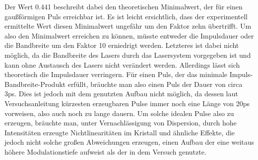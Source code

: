 Der Wert 0.441 beschreibt dabei den theoretischen Minimalwert, der für einen gaußförmigen Puls erreichbar ist. Es ist leicht ersichtlich, dass der experimentell ermittelte Wert diesen Minimalwert ungefähr um den Faktor zehn übertrifft. Um also den Minimalwert erreichen zu können, müsste entweder die Impulsdauer oder die Bandbreite um den Faktor 10 erniedrigt werden. Letzteres ist dabei nicht möglich, da die Bandbreite des Lasers durch das Lasersystem vorgegeben ist und kann ohne Austausch des Lasers nicht verändert werden. Allerdings lässt sich theoretisch die Impulsdauer verringern. Für einen Puls, der das minimale Impuls-Bandbreite-Produkt erfüllt, bräuchte man also einen Puls der Dauer von circa 3ps. Dies ist jedoch mit dem genutzten Aufbau nicht möglich, da dessen laut Versuchsanleitung kürzesten erzeugbaren Pulse immer noch eine Länge von 20ps vorweisen, also auch noch zu lange dauern. Um solche idealen Pulse also zu erzeugen, bräuchte man, unter Vernachlässigung von Dispersion, durch hohe Intensitäten erzeugte Nichtlinearitäten im Kristall und ähnliche Effekte, die jedoch nicht solche großen Abweichungen erzeugen, einen Aufbau der eine weitaus höhere Modulationstiefe aufweist als der in dem Versuch genutzte.
